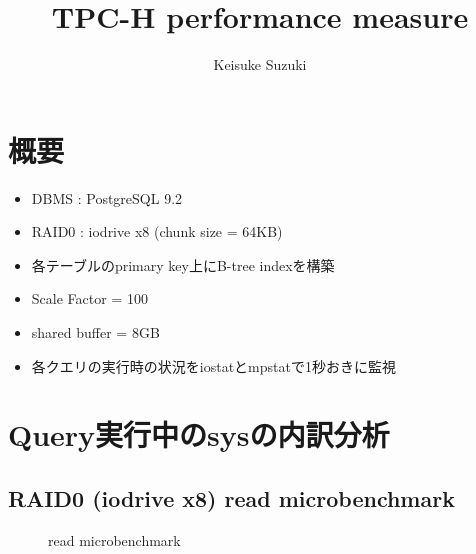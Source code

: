 \documentclass[11pt,a4paper]{jsarticle}
\title{TPC-H performance measure}
\author{Keisuke Suzuki}
\newlength{\subfigwidth}
\newlength{\subfigcolsep}
\begin{document}
\maketitle
\section{概要}
\begin{itemize}
 \item DBMS : PostgreSQL 9.2
 \item RAID0 : iodrive x8 (chunk size = 64KB)
 \item 各テーブルのprimary key上にB-tree indexを構築
 \item Scale Factor = 100
 \item shared buffer = 8GB
 \item 各クエリの実行時の状況をiostatとmpstatで1秒おきに監視
\end{itemize}

\section{Query実行中のsysの内訳分析}
\subsection{RAID0 (iodrive x8) read microbenchmark}
\begin{figure}[thbp]
 \setlength{\subfigwidth}{.5\linewidth}
 \addtolength{\subfigwidth}{-.5\subfigcolsep}
 \begin{minipage}[b]{\subfigwidth}
 \end{minipage}
  \begin{minipage}[b]{\subfigwidth}
  \end{minipage}
  \caption{read microbenchmark}
  \label{fig:rmbench}
\end{figure}
\end{document}
